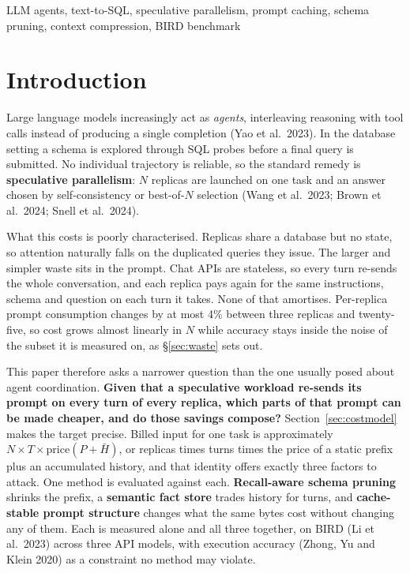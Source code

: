 \documentclass[conference]{IEEEtran}
\begin{document}
\begin{IEEEkeywords}
LLM agents, text-to-SQL, speculative parallelism, prompt caching, schema
pruning, context compression, BIRD benchmark
\end{IEEEkeywords}


\section{Introduction}\label{sec:intro}

Large language models increasingly act as \emph{agents}, interleaving reasoning
with tool calls instead of producing a single completion (Yao et al.~2023). In
the database setting a schema is explored through SQL probes before a final
query is submitted. No individual trajectory is reliable, so the standard remedy
is \textbf{speculative parallelism}: $N$ replicas are launched on one task and
an answer chosen by self-consistency or best-of-$N$ selection (Wang et al.~2023;
Brown et al.~2024; Snell et al.~2024).

What this costs is poorly characterised. Replicas share a database but no state,
so attention naturally falls on the duplicated queries they issue. The larger
and simpler waste sits in the prompt. Chat APIs are stateless, so every turn
re-sends the whole conversation, and each replica pays again for the same
instructions, schema and question on each turn it takes. None of that amortises.
Per-replica prompt consumption changes by at most 4\% between three replicas and
twenty-five, so cost grows almost linearly in $N$ while accuracy stays inside
the noise of the subset it is measured on, as §\ref{sec:waste} sets out.

This paper therefore asks a narrower question than the one usually posed about
agent coordination. \textbf{Given that a speculative workload re-sends its
prompt on every turn of every replica, which parts of that prompt can be made
cheaper, and do those savings compose?} Section~\ref{sec:costmodel} makes the
target precise. Billed input for one task is approximately $N \times T \times
\mathrm{price}(P + \bar{H})$, or replicas times turns times the price of a
static prefix plus an accumulated history, and that identity offers exactly
three factors to attack. One method is evaluated against each. \textbf{Recall-aware schema pruning}
shrinks the prefix, a \textbf{semantic fact store} trades history for turns, and
\textbf{cache-stable prompt structure} changes what the same bytes cost without
changing any of them. Each is measured alone and all three together, on BIRD
(Li et al.~2023) across three API models, with execution accuracy (Zhong, Yu and
Klein 2020) as a constraint no method may violate.
\end{document}
